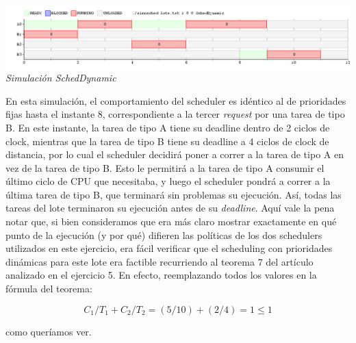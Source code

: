\vspace{\baselineskip}
\begin{center}
\includegraphics[scale=0.45]{../tp1/Test/ejercicio9-2.png}
\\
\vspace{1pt}
\footnotesize\textit{Simulaci\'on SchedDynamic}
\end{center}
\vspace{\baselineskip}

En esta simulaci\'on, el comportamiento del scheduler es id\'entico al de prioridades fijas hasta el instante 8, correspondiente a la tercer \textit{request}
por una tarea de tipo B. En este instante, la tarea de tipo A tiene su deadline dentro de 2 ciclos de clock, mientras que la tarea de tipo B tiene
su deadline a 4 ciclos de clock de distancia, por lo cual el scheduler decidir\'a poner a correr a la tarea de tipo A en vez de la tarea de tipo B.
Esto le permitir\'a a la tarea de tipo A consumir el \'ultimo ciclo de CPU que necesitaba, y luego el scheduler pondr\'a a correr a la \'ultima
tarea de tipo B, que terminar\'a sin problemas su ejecuci\'on. As\'i, todas las tareas del lote terminaron su ejecuci\'on antes de su \textit{deadline}.
Aqu\'i vale la pena notar que, si bien consideramos que era m\'as claro mostrar exactamente en qu\'e punto de la ejecuci\'on (y por qu\'e) difieren las 
pol\'iticas de los dos schedulers utilizados en este ejercicio, era f\'acil verificar que el scheduling con prioridades din\'amicas para este lote era
factible recurriendo al teorema 7 del art\'iculo analizado en el ejercicio 5. En efecto, reemplazando todos los valores en la f\'ormula del teorema:

\begin{equation*}
 C_{1}/T_{1} + C_{2}/T_{2} = (5/10) + (2/4) = 1 \leq 1
\end{equation*}

como quer\'iamos ver.
